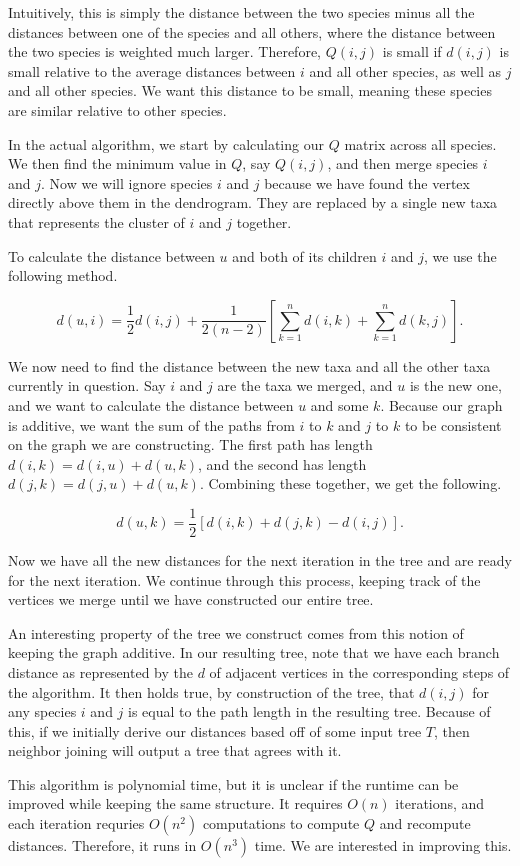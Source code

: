 Intuitively, this is simply the distance between the two species minus all the distances between one of the species and all others, where the distance between the two species is weighted much larger. Therefore, $Q(i,j)$ is small if $d(i,j)$ is small relative to the average distances between $i$ and all other species, as well as $j$ and all other species. We want this distance to be small, meaning these species are similar relative to other species.

In the actual algorithm, we start by calculating our $Q$ matrix across all species. We then find the minimum value in $Q$, say $Q(i,j)$, and then merge species $i$ and $j$. Now we will ignore species $i$ and $j$ because we have found the vertex directly above them in the dendrogram. They are replaced by a single new taxa that represents the cluster of $i$ and $j$ together.

To calculate the distance between $u$ and both of its children $i$ and $j$, we use the following method.

\[d(u,i) = \frac12d(i,j) + \frac1{2(n-2)} \left[\sum_{k=1}^n d(i,k) + \sum_{k=1}^n d(k,j)\right].\]

We now need to find the distance between the new taxa and all the other taxa currently in question. Say $i$ and $j$ are the taxa we merged, and $u$ is the new one, and we want to calculate the distance between $u$ and some $k$. Because our graph is additive, we want the sum of the paths from $i$ to $k$ and $j$ to $k$ to be consistent on the graph we are constructing. The first path has length $d(i,k) = d(i,u) + d(u,k)$, and the second has length $d(j,k) = d(j,u) + d(u,k)$. Combining these together, we get the following.

\[d(u,k) = \frac12[d(i,k) + d(j,k) - d(i,j)].\]

Now we have all the new distances for the next iteration in the tree and are ready for the next iteration. We continue through this process, keeping track of the vertices we merge until we have constructed our entire tree.

An interesting property of the tree we construct comes from this notion of keeping the graph additive. In our resulting tree, note that we have each branch distance as represented by the $d$ of adjacent vertices in the corresponding steps of the algorithm. It then holds true, by construction of the tree, that $d(i,j)$ for any species $i$ and $j$ is equal to the path length in the resulting tree. Because of this, if we initially derive our distances based off of some input tree $T$, then neighbor joining will output a tree that agrees with it.

This algorithm is polynomial time, but it is unclear if the runtime can be improved while keeping the same structure. It requires $O(n)$ iterations, and each iteration requries $O(n^2)$ computations to compute $Q$ and recompute distances. Therefore, it runs in $O(n^3)$ time. We are interested in improving this.


